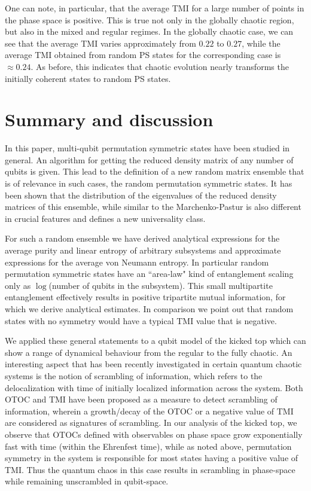 \documentclass[pre,aps,showpacs,showkeys,twocolumn]{revtex4-1}
\theoremstyle{definition}
\theoremstyle{remark}
\begin{document}
One can note, in particular, that the average TMI for a large number of points in the phase space is positive. This is true not only in the globally chaotic region, but also in the mixed and regular regimes. In the globally chaotic case, we can see that the average TMI varies approximately from $0.22$ to $0.27$, while the average TMI obtained from random PS states for the corresponding case is $\approx 0.24$. As before, this indicates that chaotic evolution nearly transforms the initially coherent states to random PS states.

\section{Summary and discussion}

In this paper, multi-qubit permutation symmetric states have been studied in general. An algorithm for getting the reduced density matrix of any number of qubits is given. This lead to the definition of a new random matrix ensemble that is of relevance in such cases, the random permutation symmetric states. It has been shown that the distribution of the  eigenvalues of the reduced density matrices of this ensemble, while similar to the Marchenko-Pastur is also different in crucial features and defines a new universality class.

For such a random ensemble we have derived analytical expressions for the average purity and linear entropy of arbitrary subsystems and approximate expressions for the average von Neumann entropy. In particular random permutation symmetric states have an ``area-law" kind of entanglement scaling only as $\log$(number of qubits in the subsystem). This small multipartite entanglement effectively results in positive tripartite mutual information, for which we derive analytical estimates. In comparison we point out that random states with no symmetry would have a typical TMI value that is negative.

We applied these general statements to a qubit model of the kicked top which can show a range of dynamical behaviour from the regular to the fully chaotic. An interesting aspect that has been recently investigated in certain quantum chaotic systems is the notion of scrambling of information, which refers to the delocalization with time of initially localized information across the system. Both OTOC and TMI have been proposed as a measure to detect scrambling of information, wherein a growth/decay of the OTOC or a negative value of TMI are considered as signatures of scrambling. In our analysis of the kicked top, we observe that OTOCs defined with observables on phase space grow exponentially fast with time (within the Ehrenfest time), while as noted above, permutation symmetry in the system is responsible for most states having a positive value of TMI. Thus the quantum chaos in this case results in scrambling in phase-space while remaining unscrambled in qubit-space.
\end{document}
